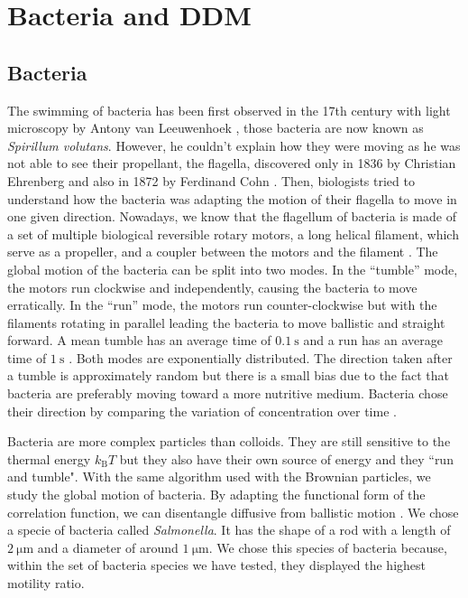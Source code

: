 \documentclass[%
 aip,
 jmp,%
 amsmath,amssymb,
reprint,%
]{revtex4-1}
\begin{document}
\section{Bacteria and DDM}
\label{sec:BactSection}

\subsection{Bacteria}

The swimming of bacteria has been first observed in the 17th century with light microscopy by Antony van Leeuwenhoek \citep{23_dobell1933antony}, those bacteria are now known as \textit{Spirillum volutans}. However, he couldn't explain how they were moving as he was not able to see their propellant, the flagella, discovered only in 1836 by Christian Ehrenberg and also in 1872 by Ferdinand Cohn \citep{24_gillen2007genesis}. Then, biologists tried to understand how the bacteria was adapting the motion of their flagella to move in one given direction.
Nowadays, we know that the flagellum of bacteria is made of a set of multiple biological reversible rotary motors, a long helical filament, which serve as a propeller, and a coupler between the motors and the filament \citep{25_delalez2001bacterial}. The global motion of the bacteria can be split into two modes. In the ``tumble'' mode, the motors run clockwise and independently, causing the bacteria to move erratically. In the ``run'' mode, the motors run counter-clockwise but with the filaments rotating in parallel leading the bacteria to move ballistic and straight forward. A mean tumble has an average time of $\SI{0.1}{\second}$ and a run has an average time of $\SI{1}{\second}$ \citep{5_berg2000motile}. Both modes are exponentially distributed. The direction taken after a tumble is approximately random but there is a small bias due to the fact that bacteria are preferably moving toward a more nutritive medium. Bacteria chose their direction by comparing the variation of concentration over time \citep{26_mitchell2006bacterial}.

Bacteria are more complex particles than colloids. They are still sensitive to the thermal energy $k_\text{B}T$ but they also have their own source of energy and they ``run and tumble". With the same algorithm used with the Brownian particles, we study the global motion of bacteria. By adapting the functional form of the correlation function, we can disentangle diffusive from ballistic motion \citep{4_Martinez20121637}. We chose a specie of bacteria called \textit{Salmonella}. It has the shape of a rod with a length of $\SI{2}{\micro\meter}$ and a diameter of around $\SI{1}{\micro\meter}$. We chose this species of bacteria because, within the set of bacteria species we have tested, they displayed the highest motility ratio.
\end{document}
